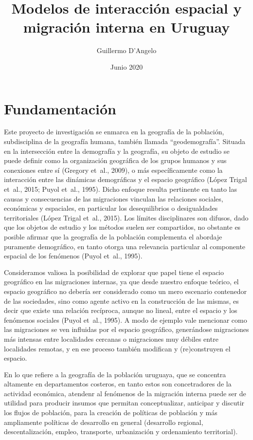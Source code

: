 \documentclass[12pt,spanish,]{article}
\title{Modelos de interacción espacial y migración interna en Uruguay}
\author{Guillermo D'Angelo}
\date{Junio 2020}
\begin{document}
\maketitle

{
\hypersetup{linkcolor=}
\setcounter{tocdepth}{3}
\tableofcontents
}
\listoftables
\listoffigures
\newpage

\hypertarget{fundamentaciuxf3n}{%
\section{Fundamentación}\label{fundamentaciuxf3n}}

Este proyecto de investigación se enmarca en la geografía de la
población, subdisciplina de la geografía humana, también llamada
``geodemografía''. Situada en la intersección entre la demografía y la
geografía, su objeto de estudio se puede definir como la organización
geográfica de los grupos humanos y sus conexiones entre sí (Gregory
et~al., 2009), o más específicamente como la interacción entre las
dinámicas demográficas y el espacio geográfico (López Trigal et~al.,
2015; Puyol et~al., 1995). Dicho enfoque resulta pertinente en tanto las
causas y consecuencias de las migraciones vinculan las relaciones
sociales, económicas y espaciales, en particular los desequilibrios o
desigualdades territoriales (López Trigal et~al., 2015). Los límites
disciplinares son difusos, dado que los objetos de estudio y los métodos
suelen ser compartidos, no obstante es posible afirmar que la geografía
de la población complementa el abordaje puramente demográfico, en tanto
otorga una relevancia particular al componente espacial de los fenómenos
(Puyol et~al., 1995).

Consideramos valiosa la posibilidad de explorar que papel tiene el
espacio geográfico en las migraciones internas, ya que desde nuestro
enfoque teórico, el espacio geográfico no debería ser considerado como
un mero escenario contenedor de las sociedades, sino como agente activo
en la construcción de las mismas, es decir que existe una relación
recíproca, aunque no lineal, entre el espacio y los fenómenos sociales
(Puyol et~al., 1995). A modo de ejemplo vale mencionar como las
migraciones se ven influidas por el espacio geográfico, generándose
migraciones más intensas entre localidades cercanas o migraciones muy
débiles entre localidades remotas, y en ese proceso también modifican y
(re)construyen el espacio.

En lo que refiere a la geografía de la población uruguaya, que se
concentra altamente en departamentos costeros, en tanto estos son
concetradores de la actividad económica, atendenr al fenómenos de la
migración interna puede ser de utilidad para producir insumos que
permitan conceptualizar, anticipar y discutir los flujos de población,
para la creación de políticas de población y más ampliamente políticas
de desarrollo en general (desarrollo regional, descentalización, empleo,
transporte, urbanización y ordenamiento territorial).
\end{document}
